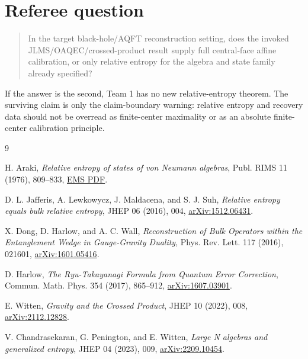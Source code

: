 \documentclass[12pt]{article}
\theoremstyle{remark}
\begin{document}
\section{Referee question}

\begin{quote}
In the target black-hole/AQFT reconstruction setting, does the invoked
JLMS/OAQEC/crossed-product result supply full central-face affine calibration,
or only relative entropy for the algebra and state family already specified?
\end{quote}

If the answer is the second, Team 1 has no new relative-entropy theorem.  The
surviving claim is only the claim-boundary warning: relative entropy and
recovery data should not be overread as finite-center maximality or as an
absolute finite-center calibration principle.

\begin{thebibliography}{9}

H. Araki,
\emph{Relative entropy of states of von Neumann algebras},
Publ. RIMS 11 (1976), 809--833,
\href{https://ems.press/content/serial-article-files/41836}{EMS PDF}.

D. L. Jafferis, A. Lewkowycz, J. Maldacena, and S. J. Suh,
\emph{Relative entropy equals bulk relative entropy},
JHEP 06 (2016), 004,
\href{https://arxiv.org/abs/1512.06431}{arXiv:1512.06431}.

X. Dong, D. Harlow, and A. C. Wall,
\emph{Reconstruction of Bulk Operators within the Entanglement Wedge in
Gauge-Gravity Duality},
Phys. Rev. Lett. 117 (2016), 021601,
\href{https://arxiv.org/abs/1601.05416}{arXiv:1601.05416}.

D. Harlow,
\emph{The Ryu-Takayanagi Formula from Quantum Error Correction},
Commun. Math. Phys. 354 (2017), 865--912,
\href{https://arxiv.org/abs/1607.03901}{arXiv:1607.03901}.

E. Witten,
\emph{Gravity and the Crossed Product},
JHEP 10 (2022), 008,
\href{https://arxiv.org/abs/2112.12828}{arXiv:2112.12828}.

V. Chandrasekaran, G. Penington, and E. Witten,
\emph{Large N algebras and generalized entropy},
JHEP 04 (2023), 009,
\href{https://arxiv.org/abs/2209.10454}{arXiv:2209.10454}.

\end{thebibliography}
\end{document}
